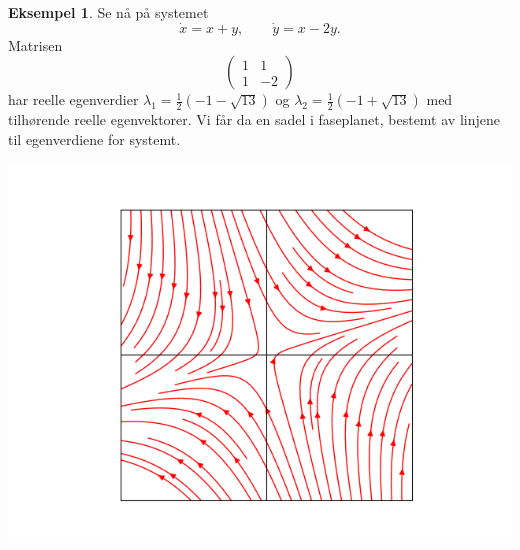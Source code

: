 \documentclass{article}
\theoremstyle{plain}
\theoremstyle{definition}
\newtheorem{eksempel}[teorem]{Eksempel}
\theoremstyle{remark}
\begin{document}
\begin{eksempel}
    Se nå på systemet
    \begin{equation*}
        \dot{x} = x + y, \qquad \dot{y} = x - 2y.
    \end{equation*}
    Matrisen
    \begin{equation*}
        \begin{pmatrix}
            1 & 1 \\
            1 & -2
        \end{pmatrix}
    \end{equation*}
    har reelle egenverdier $\lambda_1 = \frac{1}{2} (-1 - \sqrt{13})$ og $\lambda_2 = \frac{1}{2} (-1 + \sqrt{13})$ med tilhørende reelle egenvektorer. Vi får da en sadel i faseplanet, bestemt av linjene til egenverdiene for systemt.
    \begin{center}
        \includegraphics[scale=0.5]{phase_plane_3.png}
    \end{center}
\end{eksempel}
\end{document}
